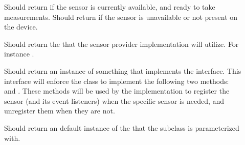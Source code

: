 
\begin{description}
	\item[] Should return  if the sensor is currently available, and ready to take measurements. Should return  if the sensor is unavailable or not present on the device.

	\item[] Should return the  that the sensor provider implementation will utilize. For instance .

	\item[] Should return an instance of something that implements the  interface. This interface will enforce the class to implement the following two methods:  and . These methods will be used by the  implementation to register the sensor (and its event listeners) when the specific sensor is needed, and unregister them when they are not.

  \item[] Should return an default instance of the  that the subclass is parameterized with.

\end{description}

